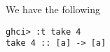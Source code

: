 
We have the following
\scriptsize\begin{verbatim}
ghci> :t take 4
take 4 :: [a] -> [a]
\end{verbatim}\normalsize
